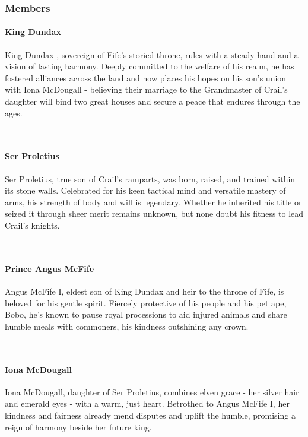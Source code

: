 \documentclass[letterpaper,openany,oneside,twocolumn]{book}
\begin{document}
\subsubsection*{Members}
{\entryfont\paragraph*{King Dundax } King Dundax , sovereign of Fife's storied throne, rules with a steady hand and a vision of lasting harmony. Deeply committed to the welfare of his realm, he has fostered alliances across the land and now places his hopes on his son's union with Iona McDougall - believing their marriage to the Grandmaster of Crail's daughter will bind two great houses and secure a peace that endures through the ages.}\\
{\entryfont\paragraph*{Ser Proletius} Ser Proletius, true son of Crail's ramparts, was born, raised, and trained within its stone walls. Celebrated for his keen tactical mind and versatile mastery of arms, his strength of body and will is legendary. Whether he inherited his title or seized it through sheer merit remains unknown, but none doubt his fitness to lead Crail's knights.}\\
{\entryfont\paragraph*{Prince Angus McFife} Angus McFife I, eldest son of King Dundax  and heir to the throne of Fife, is beloved for his gentle spirit. Fiercely protective of his people and his pet ape, Bobo, he's known to pause royal processions to aid injured animals and share humble meals with commoners, his kindness outshining any crown.}\\
{\entryfont\paragraph*{Iona McDougall} Iona McDougall, daughter of Ser Proletius, combines elven grace - her silver hair and emerald eyes - with a warm, just heart. Betrothed to Angus McFife I, her kindness and fairness already mend disputes and uplift the humble, promising a reign of harmony beside her future king.}
\end{document}
